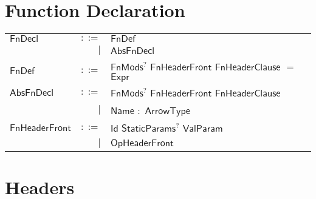 \section{Function Declaration} 

 
\begin{longtable}[l]{p{3cm}rl}
$\mathsf{FnDecl}$ &  $\mathsf{::=}$  & $\mathsf{FnDef}$ \\
 & $\big|$ &  $\mathsf{AbsFnDecl}$ \\
$\mathsf{FnDef}$ &  $\mathsf{::=}$  & $\mathsf{FnMods}$$^?$ $\mathsf{FnHeaderFront}$ $\mathsf{FnHeaderClause}$ $\mathbf{=}$ $\mathsf{Expr}$ \\
$\mathsf{AbsFnDecl}$ &  $\mathsf{::=}$  & $\mathsf{FnMods}$$^?$ $\mathsf{FnHeaderFront}$ $\mathsf{FnHeaderClause}$ \\
 & $\big|$ &  $\mathsf{Name}$ $\mathbf{:}$ $\mathsf{ArrowType}$ \\
$\mathsf{FnHeaderFront}$ &  $\mathsf{::=}$  & $\mathsf{Id}$ $\mathsf{StaticParams}$$^?$ $\mathsf{ValParam}$ \\
 & $\big|$ &  $\mathsf{OpHeaderFront}$ \\
\end{longtable} \hfill 

\section{Headers} 

